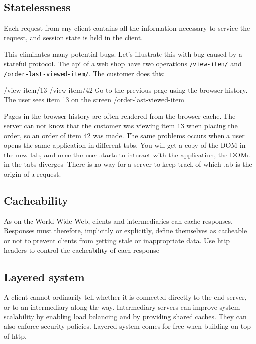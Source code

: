 \subsection{Statelessness}
Each request from any client contains all the information necessary to service the request, and session state is held in the client.

This eliminates many potential bugs. Let's illustrate this with bug caused by a stateful protocol. The api of a web shop have two operations \texttt{/view-item/} and \texttt{/order-last-viewed-item/}. The customer does this:
\begin{Code}
/view-item/13
/view-item/42
  Go to the previous page using the browser history.
  The user sees item 13 on the screen
/order-last-viewed-item
\end{Code}
Pages in the browser history are often rendered from the browser cache. The server can not know that the customer was viewing item 13 when placing the order, so an order of item 42 was made. The same problems occurs when a user opens the same application in different tabs. You will get a copy of the DOM in the new tab, and once the user starts to interact with the application, the DOMs in the tabs diverges. There is no way for a server to keep track of which tab is the origin of a request.

\subsection{Cacheability}
As on the World Wide Web, clients and intermediaries can cache responses. Responses must therefore, implicitly or explicitly, define themselves as cacheable or not to prevent clients from getting stale or inappropriate data. Use http headers to control the cacheability of each response.

\subsection{Layered system}
A client cannot ordinarily tell whether it is connected directly to the end server, or to an intermediary along the way. Intermediary servers can improve system scalability by enabling load balancing and by providing shared caches. They can also enforce security policies. Layered system comes for free when building on top of http.

